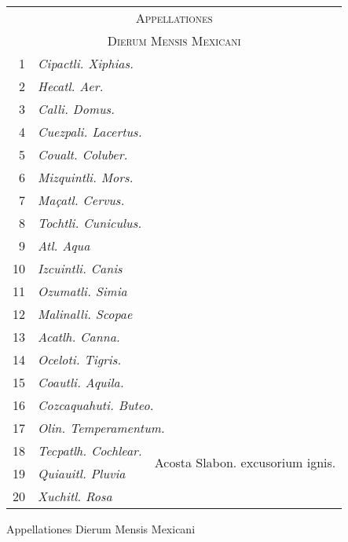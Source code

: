 %
\begin{tabnums} %
\normalsize
\centering
\newcommand{\hts}{\scriptsize}
\newcommand{\cwd}{3.2em}
%
\newcommand{\da}{\scriptsize{†}}
\begin{tabular}{@{} r l@{}l @{}}
\toprule
\multicolumn{3}{c}{\Large\textsc{Appellationes}} \\
\multicolumn{3}{c}{\large\textsc{Dierum Mensis Mexicani}} \\
\toprule
 1 & \textit{Cipactli. Xiphias.} \\
 2 & \textit{Hecatl. Aer.} \\
 3 & \textit{Calli. Domus.} \\
 4 & \textit{Cuezpali. Lacertus.} \\
 5 & \textit{Coualt. Coluber.} \\
 6 & \textit{Mizquintli. Mors.} \\
 7 & \textit{Maçatl. Cervus.} \\
 8 & \textit{Tochtli. Cuniculus.} \\
 9 & \textit{Atl. Aqua} \\
10 & \textit{Izcuintli. Canis} \\
11 & \textit{Ozumatli. Simia} \\
12 & \textit{Malinalli. Scopae} \\
13 & \textit{Acatlh. Canna.} \\
14 & \textit{Oceloti. Tigris.} \\
15 & \textit{Coautli. Aquila. } \\
16 & \multicolumn{2}{l}{\textit{Cozcaquahuti. Buteo.}} \\
17 & \multicolumn{2}{l}{\textit{Olin. Temperamentum.}} \\
18 & \textit{Tecpatlh. Cochlear.} &
  \multirow[t]{2}{.6in}[2pt]{\tiny{Acosta Slabon. excusorium ignis.}} \\
19 & \textit{Quiauitl. Pluvia} \\
20 & \textit{Xuchitl. Rosa} \\
\bottomrule
\end{tabular}
%
\caption{Appellationes Dierum Mensis Mexicani}
\label{tab:p224b}
%
\end{tabnums}

